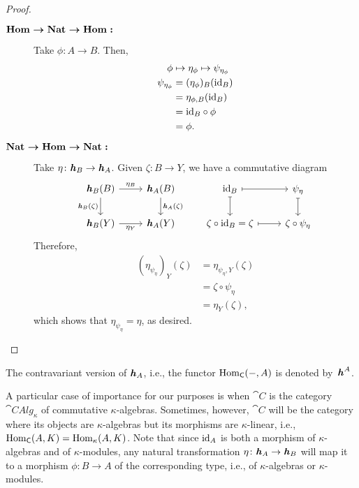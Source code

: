 \begin{proof}
    \begin{description}
        \item[$\textrm{\boldmath${\rm Hom}\to\operatorname{Nat}\to{\rm Hom}:$}$] Take $\phi\colon A\to B$. Then,
        \begin{align*}
            \phi&\mapsto\eta_\phi\mapsto\psi_{\eta_\phi}\\
            \psi_{\eta_\phi} &= (\eta_\phi)_B(\text{\rm id}_B)\\
                &= \eta_{\phi,B}(\text{\rm id}_B)\\
                &= \text{\rm id}_B\circ\phi\\
                &= \phi.
        \end{align*}
        \item[$\textrm{\boldmath$\operatorname{Nat}\to{\rm Hom}\to\operatorname{Nat}:$}$] Take $\eta\colon\textrm{\boldmath$\mathit h$}_B\to\textrm{\boldmath$\mathit h$}_A$. Given $\zeta\colon B\to Y$, we have a commutative diagram
        $$
            \begin{tikzcd}
                \yoneda_B(B)
                        \arrow[d,"\yoneda_B(\zeta)"']
                        \arrow[r,"\eta_B"]
                    &\yoneda_A(B)
                        \arrow[d,"\yoneda_A(\zeta)"]
                    &\id_B
                        \arrow[r,mapsto]
                        \arrow[d,mapsto]
                    &\psi_\eta
                        \arrow[d,mapsto]\\
                \yoneda_B(Y)
                        \arrow[r,"\eta_Y"']
                    &\yoneda_A(Y)&\zeta\circ\id_B=\zeta
                        \arrow[r,mapsto]
                    &\zeta\circ\psi_\eta
            \end{tikzcd}
        $$
        Therefore,
        \begin{align*}
            (\eta_{\psi_\eta})_Y(\zeta) &= \eta_{\psi_\eta,Y}(\zeta)\\
                &= \zeta\circ\psi_\eta\\
                &= \eta_Y(\zeta),
        \end{align*}
        which shows that $\eta_{\psi_\eta}=\eta$, as desired.
    \end{description}
\end{proof}

\begin{rem}
    The contravariant version of $\textrm{\boldmath$\mathit h$}_A$, i.e., the functor ${\rm Hom}_{\mathsf{C}}(-,A)$ is denoted by~$\textrm{\boldmath$\mathit h$}^A$.
\end{rem}

\begin{rem}\label{rem:two-categories}
    A particular case of importance for our purposes is when $\cat C$ is the category $\cat{CAlg}_\kappa$ of commutative $\kappa$-algebras. Sometimes, however, $\cat C$ will be the category where its objects are $\kappa$-algebras but its morphisms are $\kappa$-linear, i.e., ${\rm Hom}_{\mathsf{C}}(A,K)={\rm Hom}_\kappa(A,K)$. Note that since $\text{\rm id}_A$ is both a morphism of $\kappa$-algebras and of $\kappa$-modules, any natural transformation $\eta\colon\textrm{\boldmath$\mathit h$}_A\to\textrm{\boldmath$\mathit h$}_B$ will map it to a morphism $\phi\colon B\to A$ of the corresponding type, i.e., of $\kappa$-algebras or $\kappa$-modules.
\end{rem}


